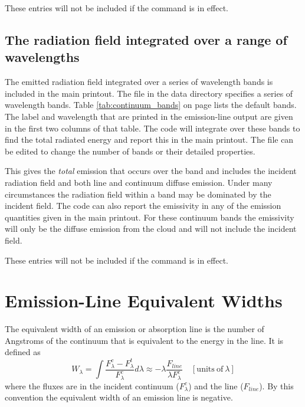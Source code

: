 These entries will not be included if the  command
is in effect.

\subsection{The radiation field integrated over a range of wavelengths}
The emitted
radiation field integrated over a series of wavelength bands is included
in the main printout.
The file  in the data
directory specifies a series of wavelength bands.
Table \ref{tab:continuum_bands} on page \pageref{tab:continuum_bands}
lists the default bands.
The label and wavelength
that are printed in the emission-line output are
given in the first two columns of that table.
The code
will integrate over these bands to find the total radiated
energy and report this in the main printout.
The  file can be edited to change
the number of bands or their detailed properties.

This gives the \emph{total} emission that occurs over the band
and includes the incident radiation field and both line and continuum
diffuse emission.
Under many circumstances the radiation field within a band may be
dominated by the incident field.
The code can also report the emissivity in any of the emission
quantities given in the main printout.
For these continuum bands the emissivity will only be the
diffuse emission from the cloud and will not include the incident field.

These entries will not be included if the  command
is in effect.

\section{Emission-Line Equivalent Widths}

The equivalent width of an emission or absorption line is the number
of Angstroms of the continuum that is equivalent
to the energy in the line.
It is defined as
\begin{equation}
\label{eqn:EquivalentWidth}
W_\lambda =\int \frac{F_\lambda ^c-F_\lambda ^t}{F_\lambda ^c} d\lambda
\approx - \lambda \frac{F_{line}}{\lambda F_\lambda ^c}\quad
  [\mathrm{units\ of}~ \lambda]%
\end{equation}
where the fluxes are in the incident continuum
($F_\lambda ^c$) and the line ($F_{line}$).
By this convention the equivalent width of an
emission line is negative.

